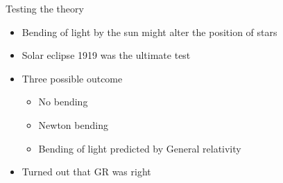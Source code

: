 \documentclass{beamer}
\begin{document}
\begin{frame}{Testing the theory}
     \begin{itemize}
       \item<1->{Bending of light by the sun might alter the position of stars}
       \item{Solar eclipse 1919 was the ultimate test}
         \item{Three possible outcome}
         \begin{itemize}
         \item{No bending}
         \item{Newton bending}
         \item{Bending of light predicted by General relativity}
         \end{itemize}
       \item{Turned out that GR was right}
    \end{itemize}


 \end{frame}
\end{document}

